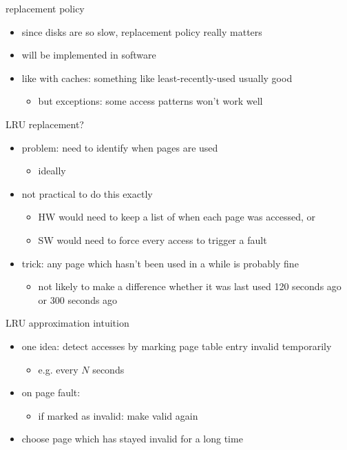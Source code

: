 \begin{frame}{replacement policy}
    \begin{itemize}
    \item since disks are so slow, replacement policy really matters
    \item will be implemented in software
        \vspace{.5cm}
    \item like with caches: something like least-recently-used usually good
        \begin{itemize}
        \item but exceptions: some access patterns won't work well
        \end{itemize}
    \end{itemize}
\end{frame}

\begin{frame}{LRU replacement?}
\begin{itemize}
\item problem: need to identify when pages are used
    \begin{itemize}
    \item ideally 
    \end{itemize}
\item not practical to do this exactly
    \begin{itemize}
    \item HW would need to keep a list of when each page was accessed, or
    \item SW would need to force every access to trigger a fault
    \end{itemize}
\item trick: any page which hasn't been used in a while is probably fine 
    \begin{itemize}
    \item not likely to make a difference whether it was last used 120 seconds ago or 300 seconds ago
    \end{itemize}
\end{itemize}
\end{frame}

\begin{frame}{LRU approximation intuition}
\begin{itemize}
\item one idea: detect accesses by marking page table entry invalid temporarily
    \begin{itemize}
    \item e.g. every $N$ seconds
    \end{itemize}
\item on page fault:
    \begin{itemize}
    \item if marked as invalid: make valid again
    \end{itemize}
\item choose page which has stayed invalid for a long time
\end{itemize}
\end{frame}

